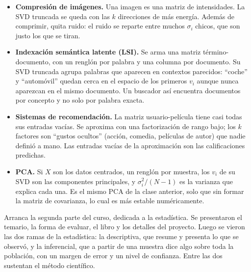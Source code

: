 \documentclass[11pt,letterpaper]{article}
\begin{document}
\begin{itemize}[itemsep=0.3em]
    \item \textbf{Compresión de imágenes.} Una imagen es una matriz de
          intensidades. La SVD truncada se queda con las $k$
          direcciones de más energía. Además de comprimir, quita
          ruido: el ruido se reparte entre muchos $\sigma_i$ chicos,
          que son justo los que se tiran.
    \item \textbf{Indexación semántica latente (LSI).} Se arma una
          matriz término-documento, con un renglón por palabra y una
          columna por documento. Su SVD truncada agrupa palabras que
          aparecen en contextos parecidos: ``coche'' y ``automóvil''
          quedan cerca en el espacio de los primeros $v_i$ aunque
          nunca aparezcan en el mismo documento. Un buscador así
          encuentra documentos por concepto y no solo por palabra
          exacta.
    \item \textbf{Sistemas de recomendación.} La matriz
          usuario-película tiene casi todas sus entradas vacías. Se
          aproxima con una factorización de rango bajo; los $k$
          factores son ``gustos ocultos'' (acción, comedia,
          películas de autor) que nadie definió a mano. Las entradas
          vacías de la aproximación son las calificaciones predichas.
    \item \textbf{PCA.} Si $X$ son los datos centrados, un renglón por
          muestra, los $v_i$ de su SVD son las componentes
          principales, y $\sigma_i^2 / (N - 1)$ es la varianza que
          explica cada una. Es el mismo PCA de la clase anterior, solo
          que sin formar la matriz de covarianza, lo cual es más
          estable numéricamente.
\end{itemize}

\newpage



\begin{quick_sum}
    Arranca la segunda parte del curso, dedicada a la estadística. Se
    presentaron el temario, la forma de evaluar, el libro y los
    detalles del proyecto. Luego se vieron las dos ramas de la
    estadística: la descriptiva, que resume y presenta lo que se
    observó, y la inferencial, que a partir de una muestra dice algo
    sobre toda la población, con un margen de error y un nivel de
    confianza. Entre las dos sustentan el método científico.
\end{quick_sum}
\end{document}
